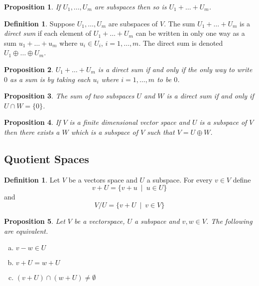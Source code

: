 \documentclass[12pt,letterpaper]{amsart}
\theoremstyle{plain}
\newtheorem{proposition}{Proposition}[section]
\theoremstyle{definition}
\newtheorem{definition}[theorem]{Definition}
\numberwithin{equation}{section}
\begin{document}
\begin{proposition} If $U_1, \ldots, U_m$ are subspaces then so is $U_1+\ldots+U_m$. 
\end{proposition}

\begin{definition} Suppose $U_1,\ldots, U_m$ are subspaces of $V$. The sum $U_1+\ldots+U_m$ is a \emph{direct sum} if each element of $U_1+\ldots+U_m$ can be written in only one way as a sum $u_1+\ldots +u_m$ where $u_i\in U_i$, $i=1,\ldots,m$. The direct sum is denoted $U_1\oplus \ldots \oplus U_m$. 
\end{definition}

\begin{proposition}  $U_1+\ldots+U_m$ is a direct sum if and only if the only way to write $0$ as a sum is by taking each $u_i$ where $i=1, \ldots, m$ to be $0$. 
\end{proposition}

\begin{proposition}  The sum of two subspaces $U$ and $W$ is a direct sum if and only if\\ $U\cap W=\{0\}$. 
\end{proposition}

\begin{proposition} If $V$ is a finite dimensional vector space and $U$ is a subspace of $V$ then there exists a $W$ which is a subspace of $V$ such that $V=U\oplus W$. 
\end{proposition}

\subsection{Quotient Spaces} 

\begin{definition}Let $V$ be a vectors space and $U$ a subspace. For every $v\in V$ define 
\[v+U=\{v+u\ \mid\  u\in U\}\]
and 
\[V/U=\{v+U\ \mid\  v\in V\}\]
\end{definition}
\begin{proposition}Let $V$ be a vectorspace, $U$ a subspace and $v,w\in V$.  The following are equivalent. 
\begin{enumerate}[(a)]
\item $v-w\in U$
\item $v+U=w+U$
\item $(v+U)\cap (w+U)\neq \emptyset$
\end{enumerate}
\end{proposition}
\end{document}
